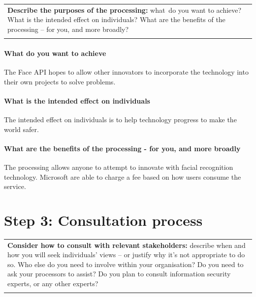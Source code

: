 \documentclass[12pt]{extarticle}
\begin{document}



\begin{table}[!ht]
 			\centering
\begin{tabular}{p{\linewidth}}
\hline
\multicolumn{1}{|p{\linewidth}|}{\textbf{Describe the purposes of the processing: }what\ do you want to achieve? What is the intended effect on individuals? What are the benefits of the processing – for  you, and more broadly? } \\
\hhline{-}
\end{tabular}
 \end{table}

 \paragraph{What do you want to achieve} The Face API hopes to allow other innovators to incorporate the technology into their own projects to solve problems.

\paragraph{What is the intended effect on individuals} The intended effect on individuals is to help technology progress to make the world safer.

\paragraph{What are the benefits of the processing - for you, and more broadly} The processing allows anyone to attempt to innovate with facial recognition technology.
Microsoft are able to charge a fee based on how users consume the service.


\section*{Step 3: Consultation process}


\begin{table}[H]
\centering
\begin{tabular}{p{\linewidth}}
\hline
\multicolumn{1}{|p{\linewidth}|}{\textbf{Consider how to consult with relevant stakeholders: }describe when and how you will seek individuals’ views – or justify why it’s not appropriate to do so. Who else do you need to involve within your organisation? Do you need to ask your processors to assist? Do you plan to consult information security experts, or any other experts?} \\
\hhline{-}
\end{tabular}
\end{table}
\end{document}
